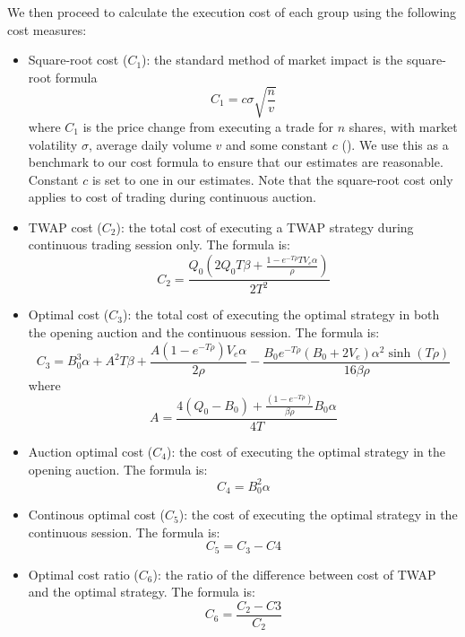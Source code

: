 We then proceed to calculate the execution cost of each group using the following cost measures:
\begin{itemize}
  \item Square-root cost ($C_1$): the standard method of market impact is the square-root formula
        \[
          C_1 = c \sigma \sqrt{\frac{n}{v}}
        \]
        where $C_1$ is the price change from executing a trade for $n$ shares, with market volatility $\sigma$, average daily volume $v$ and some constant $c$ (\cite{Toth2011}). We use this as a benchmark to our cost formula to ensure that our estimates are reasonable. Constant $c$ is set to one in our estimates. Note that the square-root cost only applies to cost of trading during continuous auction.
  \item TWAP cost ($C_2$): the total cost of executing a TWAP strategy during continuous trading session only. The formula is:
        \[
          C_2 = \frac{Q_0 (2 Q_0 T \beta + \frac{1-e^{-T \rho} T V_e \alpha}{\rho})}{2 T^2}
        \]
  \item Optimal cost ($C_3$): the total cost of executing the optimal strategy in both the opening auction and the continuous session. The formula is:
        \[
          C_3 = B_0^3 \alpha + A^2 T \beta + \frac{A (1-e^{-T \rho}) V_e \alpha}{2 \rho} - \frac{B_0 e^{-T \rho} (B_0 + 2 V_e) \alpha^2 \sinh(T \rho)}{16 \beta \rho}
        \]
        where
        \[
          A =   \frac{4 (Q_0 - B_0) + \frac{(1 - e^{-T \rho})}{\beta \rho} B_0 \alpha} {4 T}
        \]
  \item Auction optimal cost ($C_4$): the cost of executing the optimal strategy in the opening auction. The formula is:
        \[
          C_4 = B_0^2 \alpha
        \]
  \item Continous optimal cost ($C_5$): the cost of executing the optimal strategy in the continuous session. The formula is:
        \[
          C_5 = C_3 - C4
        \]
  \item Optimal cost ratio ($C_6$): the ratio of the difference between cost of TWAP and the optimal strategy. The formula is:
        \[
          C_6 = \frac{C_2 - C3}{C_2}
        \]
\end{itemize}


